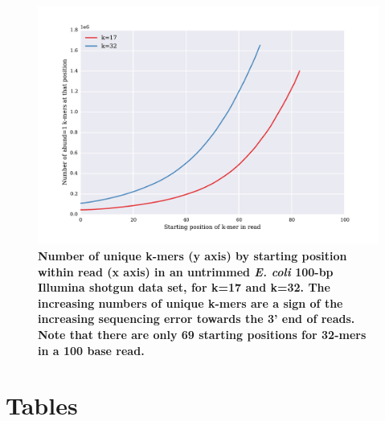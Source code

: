 \documentclass[10pt]{article}
\begin{document}
\begin{figure}[!ht]
\centerline{\includegraphics[width=5in]{./figure/perc_unique_pos}}
\caption{\bf Number of unique k-mers (y axis) by starting position
  within read (x axis) in an untrimmed {\em E. coli} 100-bp Illumina
  shotgun data set, for k=17 and k=32.  The increasing numbers of
  unique k-mers are a sign of the increasing sequencing error towards
  the 3' end of reads.  Note that there are only 69 starting positions
  for 32-mers in a 100 base read.}
\label{fig:perc_unique_pos}
\end{figure}

\clearpage
\section*{Tables}
\end{document}
